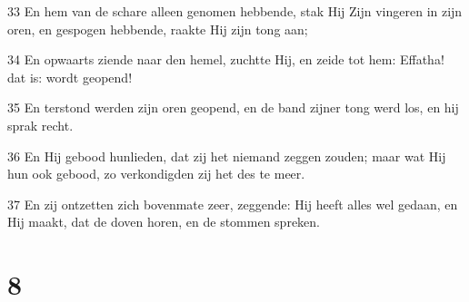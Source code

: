 \par 33 En hem van de schare alleen genomen hebbende, stak Hij Zijn vingeren in zijn oren, en gespogen hebbende, raakte Hij zijn tong aan;
\par 34 En opwaarts ziende naar den hemel, zuchtte Hij, en zeide tot hem: Effatha! dat is: wordt geopend!
\par 35 En terstond werden zijn oren geopend, en de band zijner tong werd los, en hij sprak recht.
\par 36 En Hij gebood hunlieden, dat zij het niemand zeggen zouden; maar wat Hij hun ook gebood, zo verkondigden zij het des te meer.
\par 37 En zij ontzetten zich bovenmate zeer, zeggende: Hij heeft alles wel gedaan, en Hij maakt, dat de doven horen, en de stommen spreken.

\chapter{8}

